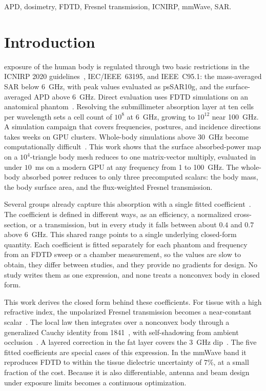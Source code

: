 \documentclass[journal,twocolumn,10pt]{IEEEtran}
\begin{document}
\begin{IEEEkeywords}
APD, dosimetry, FDTD, Fresnel transmission, ICNIRP, mmWave, SAR.
\end{IEEEkeywords}

\IEEEpeerreviewmaketitle

\section{Introduction}\label{sec:introduction}

 exposure of the human body is regulated
through two basic restrictions in the \gls{ICNIRP} 2020
guidelines~\cite{ICNIRP2020}, IEC/IEEE~63195, and IEEE~C95.1: the
mass-averaged \gls{SAR} below 6~GHz, with peak values evaluated as
\gls{psSAR10g}, and the surface-averaged \gls{APD} above 6~GHz. Direct evaluation uses
\gls{FDTD} simulations on an anatomical
phantom~\cite{Kodera2024,Diao2024,Hirata2021,Wydaeghe2026}. Resolving the submillimeter
absorption layer at ten cells per wavelength
sets a cell count of $10^{8}$ at 6~GHz, growing to $10^{12}$ near
100~GHz. A simulation campaign that covers frequencies, postures, and
incidence directions takes weeks on \gls{GPU} clusters. Whole-body
simulations above 30~GHz become computationally difficult~\cite{Wydaeghe2026}.
This work shows that the surface absorbed-power map on a
$10^4$-triangle body mesh reduces to one matrix-vector multiply,
evaluated in under $10$~ms on a modern GPU at any
frequency from 1 to 100~GHz. The whole-body absorbed power
reduces to only three precomputed scalars: the body mass, the
body surface area, and the flux-weighted Fresnel transmission.

Several groups already capture this absorption with a single fitted
coefficient~\cite{Bamba2014,Flintoft2014,Zhang2017thesis,ZhangRobinson2020,Kodera2024,Diao2024}.
The coefficient is defined in different ways, as an efficiency, a
normalized cross-section, or a transmission, but in every study it
falls between about $0.4$ and $0.7$ above $6$~GHz. This shared range
points to a single underlying closed-form quantity. Each coefficient
is fitted separately for each phantom and frequency from an \gls{FDTD}
sweep or a chamber measurement, so the values are slow to obtain, they
differ between studies, and they provide no gradients for design. No
study writes them as one expression, and none treats a nonconvex body
in closed form.

This work derives the closed form behind these coefficients. For tissue with a
high refractive index, the unpolarized Fresnel transmission becomes a
near-constant scalar~\cite{Azzam2015}. The local law then integrates
over a nonconvex body through a generalized Cauchy identity
from 1841~\cite{Cauchy1841}, with self-shadowing from ambient
occlusion~\cite{Zhukov1998,Landis2002,AkenineMoller2018}. A layered
correction in the fat layer covers the $3$~GHz dip~\cite{Flintoft2014}.
The five fitted coefficients are special cases of this expression. In
the mmWave band it reproduces \gls{FDTD} to within the tissue
dielectric uncertainty of $7\%$, at a small fraction of the cost. Because it is
also differentiable, antenna and beam design under exposure limits
becomes a continuous optimization.
\end{document}
